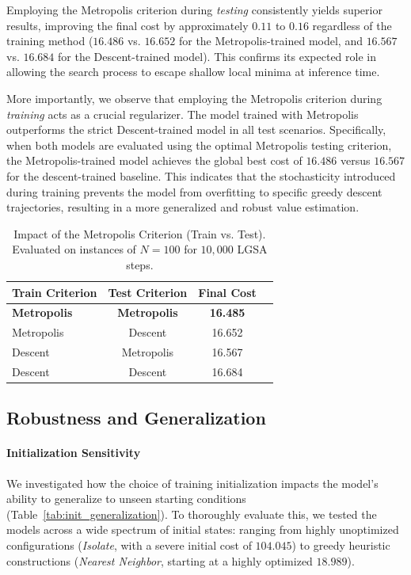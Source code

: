 \documentclass[letterpaper]{article} %
\begin{document}
Employing the Metropolis criterion during \textit{testing} consistently yields superior results, improving the final cost by approximately $0.11$ to $0.16$ regardless of the training method ($16.486$ vs. $16.652$ for the Metropolis-trained model, and $16.567$ vs. $16.684$ for the Descent-trained model). This confirms its expected role in allowing the search process to escape shallow local minima at inference time.

More importantly, we observe that employing the Metropolis criterion during \textit{training} acts as a crucial regularizer. The model trained with Metropolis outperforms the strict Descent-trained model in all test scenarios. Specifically, when both models are evaluated using the optimal Metropolis testing criterion, the Metropolis-trained model achieves the global best cost of $16.486$ versus $16.567$ for the descent-trained baseline. This indicates that the stochasticity introduced during training prevents the model from overfitting to specific greedy descent trajectories, resulting in a more generalized and robust value estimation.

\begin{table}[h]
\centering
\small
\caption{Impact of the Metropolis Criterion (Train vs. Test). Evaluated on instances of $N=100$ for $10{,}000$ LGSA steps.}
\label{tab:metropolis_ablation}
\begin{tabular}{l c c c}
\toprule
\textbf{Train Criterion} & \textbf{Test Criterion} & \textbf{Final Cost} \\
\midrule
\textbf{Metropolis} & \textbf{Metropolis} & \textbf{16.485} \\
Metropolis & Descent & 16.652 \\
\midrule
Descent & Metropolis & 16.567 \\
Descent & Descent  & 16.684 \\
\bottomrule
\end{tabular}
\end{table}

\subsection{Robustness and Generalization}

\paragraph{Initialization Sensitivity}
We investigated how the choice of training initialization impacts the model's ability to generalize to unseen starting conditions (Table~\ref{tab:init_generalization}). To thoroughly evaluate this, we tested the models across a wide spectrum of initial states: ranging from highly unoptimized configurations (\textit{Isolate}, with a severe initial cost of $104.045$) to greedy heuristic constructions (\textit{Nearest Neighbor}, starting at a highly optimized $18.989$). 
\end{document}
